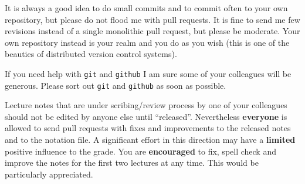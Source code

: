 \documentclass[a4paper,justified]{tufte-handout}
\begin{document}
  It is always a good idea to  do small commits and to commit often to
  your own repository, but please do  not flood me with pull requests.
  It is fine  to send me few revisions instead  of a single monolithic
  pull request, but  please be moderate.  Your  own repository instead
  is your realm and you do as you wish (this is one of the beauties of
  distributed version control systems).

  If you  need help  with \texttt{git} and  \texttt{github} I am  sure some  of your
  colleagues will  be generous. Please  sort out \texttt{git} and  \texttt{github} as
  soon as possible.

  Lecture notes that are under  scribing/review process by one of your
  colleagues should  not be  edited by  anyone else  until “released”.
  Nevertheless \textbf{everyone} is allowed to  send pull requests with fixes
  and improvements to the released notes  and to the notation file.  A
  significant effort in  this direction may have  a \textbf{limited} positive
  influence to  the grade.  You  are \textbf{encouraged} to fix,  spell check
  and improve the  notes for the first two lectures  at any time. This
  would be particularly appreciated.
\end{document}

